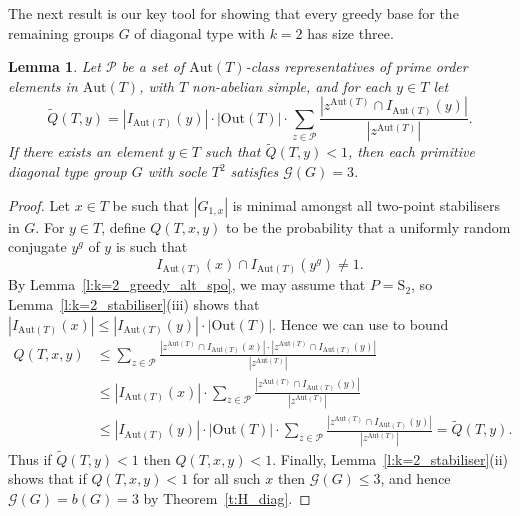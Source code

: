 \documentclass[twoside,a4paper,reqno,11pt]{amsart}
\newcommand{\QQ}{\widetilde{Q}}
\newcommand{\<}{\langle}
\renewcommand{\>}{\rangle}
\newcommand{\leqs}{\leqslant}
\newcommand{\Aut}{\mathrm{Aut}}
\newcommand{\Out}{\mathrm{Out}}
\newcommand{\Sn}{\mathrm{S}}
\newtheorem{lem}[thm]{Lemma}
\theoremstyle{definition}
\begin{document}
The next result is our key tool for showing that every greedy base for the remaining groups $G$ of diagonal type with $k = 2$ has size three. 

\begin{lem}
    \label{l:k=2_probability}
    Let $\mathcal{P}$ be a set of $\Aut(T)$-class representatives of prime order elements in $\Aut(T)$, with $T$ non-abelian simple, and for each $y \in T$ let 
    \begin{equation*}
        \widetilde{Q}(T,y) = |I_{\Aut(T)}(y)|\cdot|\mathrm{Out}(T)|\cdot \sum_{z\in\mathcal{P}}\frac{|z^{\mathrm{Aut}(T)}\cap I_{\mathrm{Aut}(T)}(y)|}{|z^{\mathrm{Aut}(T)}|}.
    \end{equation*}
    If there exists an element $y \in T$ such that $\QQ(T, y) < 1$, then each primitive diagonal type group $G$ with socle $T^2$ satisfies $\mathcal{G}(G) = 3$.
\end{lem}

\begin{proof}
    Let $x\in T$ be such that $|G_{1,x}|$ is minimal amongst all two-point stabilisers in $G$. For $y\in T$, define $Q(T,x,y)$ to be the probability that a uniformly random conjugate $y^g$ of $y$ is such that
    \begin{equation*}
        I_{\Aut(T)}(x)\cap I_{\Aut(T)}(y^g) \ne 1.
    \end{equation*}
    By Lemma~\ref{l:k=2_greedy_alt_spo}, we may assume that $P = \Sn_2$, so Lemma~\ref{l:k=2_stabiliser}(iii) shows that $|I_{\Aut(T)}(x)| \leqs |I_{\Aut(T)}(y)|\cdot|\Out(T)|$. Hence we can use \cite[Lemma 2.1]{AB_reg} to bound
    \begin{equation*}
    \begin{aligned}
        Q(T,x,y) &\leqs \sum_{z\in\mathcal{P}}\frac{|z^{\Aut(T)}\cap I_{\Aut(T)}(x)|\cdot |z^{\Aut(T)}\cap I_{\Aut(T)}(y)|}{|z^{\Aut(T)}|}%
        \\
        &\leqs |I_{\mathrm{Aut}(T)}(x)|\cdot \sum_{z\in\mathcal{P}}\frac{|z^{\mathrm{Aut}(T)}\cap I_{\mathrm{Aut}(T)}(y)|}{|z^{\mathrm{Aut}(T)}|}\\
        &\leqslant |I_{\Aut(T)}(y)|\cdot|\mathrm{Out}(T)|\cdot \sum_{z\in\mathcal{P}}\frac{|z^{\mathrm{Aut}(T)}\cap I_{\mathrm{Aut}(T)}(y)|}{|z^{\mathrm{Aut}(T)}|} = \widetilde{Q}(T,y).
    \end{aligned}
    \end{equation*}
    Thus if $\widetilde{Q}(T,y) < 1$ then $Q(T,x,y) < 1$. Finally,  Lemma~\ref{l:k=2_stabiliser}(ii) shows that if $Q(T,x,y) < 1$  for all such $x$ then $\mathcal{G}(G) \leqs 3$, 
    and hence $\mathcal{G}(G) = b(G) = 3$ by Theorem~\ref{t:H_diag}.
\end{proof}
\end{document}
